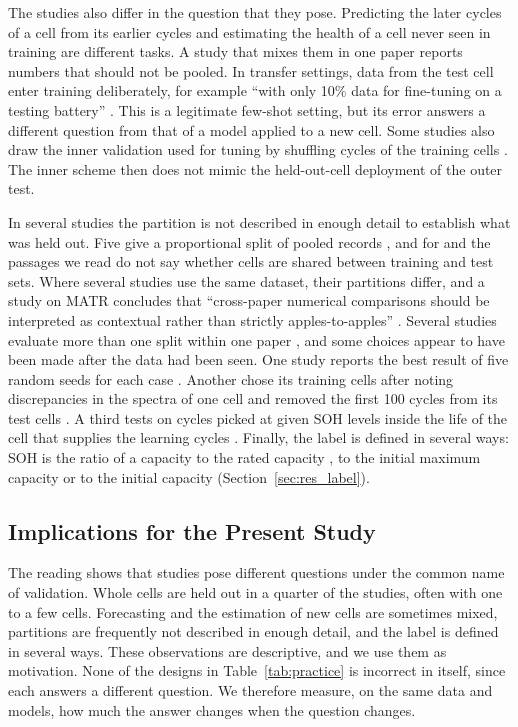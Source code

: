 \documentclass{ieeeaccess}
\begin{document}
The studies also differ in the question that they pose. Predicting the later cycles of a cell from its earlier cycles \cite{aud38,aud43,aud17,aud28,aud29,aud44,aud04,aud09,aud10,aud12,aud41} and estimating the health of a cell never seen in training are different tasks. A study that mixes them in one paper \cite{aud28,aud44} reports numbers that should not be pooled. In transfer settings, data from the test cell enter training deliberately, for example ``with only 10\% data for fine-tuning on a testing battery'' \cite{aud25,aud49}. This is a legitimate few-shot setting, but its error answers a different question from that of a model applied to a new cell. Some studies also draw the inner validation used for tuning by shuffling cycles of the training cells \cite{aud32,aud36}. The inner scheme then does not mimic the held-out-cell deployment of the outer test.

In several studies the partition is not described in enough detail to establish what was held out. Five give a proportional split of pooled records \cite{aud37,aud60,aud13,aud57,aud27}, and for \cite{aud37} and \cite{aud60} the passages we read do not say whether cells are shared between training and test sets. Where several studies use the same dataset, their partitions differ, and a study on MATR concludes that ``cross-paper numerical comparisons should be interpreted as contextual rather than strictly apples-to-apples'' \cite{aud53}. Several studies evaluate more than one split within one paper \cite{aud28,aud26,aud57}, and some choices appear to have been made after the data had been seen. One study reports the best result of five random seeds for each case \cite{aud19}. Another chose its training cells after noting discrepancies in the spectra of one cell and removed the first 100 cycles from its test cells \cite{aud46}. A third tests on cycles picked at given SOH levels inside the life of the cell that supplies the learning cycles \cite{aud40}. Finally, the label is defined in several ways: SOH is the ratio of a capacity to the rated capacity \cite{aud25}, to the initial maximum capacity \cite{aud20} or to the initial capacity \cite{aud22} (Section~\ref{sec:res_label}).

\subsection{Implications for the Present Study}
The reading shows that studies pose different questions under the common name of validation. Whole cells are held out in a quarter of the studies, often with one to a few cells. Forecasting and the estimation of new cells are sometimes mixed, partitions are frequently not described in enough detail, and the label is defined in several ways. These observations are descriptive, and we use them as motivation. None of the designs in Table~\ref{tab:practice} is incorrect in itself, since each answers a different question. We therefore measure, on the same data and models, how much the answer changes when the question changes.
\end{document}

